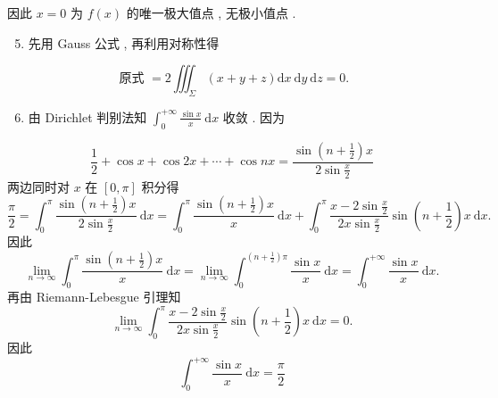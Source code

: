 \documentclass[10pt]{article}
\begin{document}
 因此  $x=0$  为  $f(x)$  的唯一极大值点 ,  无极小值点 .

\begin{enumerate}
  \setcounter{enumi}{4}
  \item  先用  Gauss  公式 ,  再利用对称性得 
\end{enumerate}
$$
\text { 原式 }=2 \iiint_{\Sigma}(x+y+z) \mathrm{d} x \mathrm{~d} y \mathrm{~d} z=0 .
$$

\begin{enumerate}
  \setcounter{enumi}{5}
  \item  由  Dirichlet  判别法知  $\int_{0}^{+\infty} \frac{\sin x}{x} \mathrm{~d} x$  收敛 .  因为 
\end{enumerate}
$$
\frac{1}{2}+\cos x+\cos 2 x+\cdots+\cos n x=\frac{\sin \left(n+\frac{1}{2}\right) x}{2 \sin \frac{x}{2}}
$$
 两边同时对  $x$  在  $[0, \pi]$  积分得 
$$
\frac{\pi}{2}=\int_{0}^{\pi} \frac{\sin \left(n+\frac{1}{2}\right) x}{2 \sin \frac{x}{2}} \mathrm{~d} x=\int_{0}^{\pi} \frac{\sin \left(n+\frac{1}{2}\right) x}{x} \mathrm{~d} x+\int_{0}^{\pi} \frac{x-2 \sin \frac{x}{2}}{2 x \sin \frac{x}{2}} \sin \left(n+\frac{1}{2}\right) x \mathrm{~d} x .
$$
 因此 
$$
\lim _{n \rightarrow \infty} \int_{0}^{\pi} \frac{\sin \left(n+\frac{1}{2}\right) x}{x} \mathrm{~d} x=\lim _{n \rightarrow \infty} \int_{0}^{\left(n+\frac{1}{2}\right) \pi} \frac{\sin x}{x} \mathrm{~d} x=\int_{0}^{+\infty} \frac{\sin x}{x} \mathrm{~d} x .
$$
 再由  Riemann-Lebesgue  引理知 
$$
\lim _{n \rightarrow \infty} \int_{0}^{\pi} \frac{x-2 \sin \frac{x}{2}}{2 x \sin \frac{x}{2}} \sin \left(n+\frac{1}{2}\right) x \mathrm{~d} x=0 .
$$
 因此 
$$
\int_{0}^{+\infty} \frac{\sin x}{x} \mathrm{~d} x=\frac{\pi}{2}
$$
\end{document}
